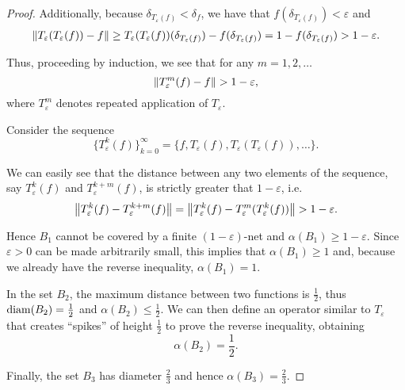 \begin{proof}
  Additionally, because \( \delta_{T_\varepsilon(f)} < \delta_f \), we have that \( f(\delta_{T_\varepsilon(f)}) < \varepsilon \) and
  \begin{align*}
    \left\Vert T_\varepsilon(T_\varepsilon(f)) - f \right\Vert
    \geq
    T_\varepsilon(T_\varepsilon(f)) (\delta_{T_\varepsilon(f)}) - f(\delta_{T_\varepsilon(f)})
    =
    1 - f(\delta_{T_\varepsilon(f)})
    >
    1 - \varepsilon.
  \end{align*}

  Thus, proceeding by induction\IND, we see that for any \( m = 1, 2, \ldots \)
  \begin{equation*}
    \left\Vert T_\varepsilon^m(f) - f \right\Vert > 1 - \varepsilon,
  \end{equation*}
  where \( T_\varepsilon^m \) denotes repeated application of \( T_\varepsilon \).

  Consider the sequence
  \begin{equation*}
    \{ T_\varepsilon^k(f) \}_{k=0}^\infty = \{ f, T_\varepsilon(f), T_\varepsilon(T_\varepsilon(f)), \ldots \}.
  \end{equation*}

  We can easily see that the distance between any two elements of the sequence, say \( T_\varepsilon^k(f) \) and \( T_\varepsilon^{k+m}(f) \), is strictly greater that \( 1 - \varepsilon \), i.e.
  \begin{align*}
    \left\Vert T_\varepsilon^k(f) - T_\varepsilon^{k+m}(f) \right\Vert
    =
    \left\Vert T_\varepsilon^k(f) - T_\varepsilon^m(T_\varepsilon^k(f)) \right\Vert
    >
    1 - \varepsilon.
  \end{align*}

  Hence \( B_1 \) cannot be covered by a finite \( (1-\varepsilon) \)-net and \( \alpha(B_1) \geq 1 - \varepsilon \). Since \( \varepsilon > 0 \) can be made arbitrarily small, this implies that \( \alpha(B_1) \geq 1 \) and, because we already have the reverse inequality, \( \alpha(B_1) = 1 \).

  In the set \( B_2 \), the maximum distance between two functions is \( \frac 1 2 \), thus \( \operatorname{diam}(B_2) = \frac 1 2 \) and \( \alpha(B_2) \leq \frac 1 2 \). We can then define an operator similar to \( T_\varepsilon \) that creates \enquote{spikes} of height \( \frac 1 2 \) to prove the reverse inequality, obtaining
  \begin{equation*}
    \alpha(B_2) = \frac 1 2.
  \end{equation*}

  Finally, the set \( B_3 \) has diameter \( \frac 2 3 \) and hence \( \alpha(B_3) = \frac 2 3 \).


\end{proof}
